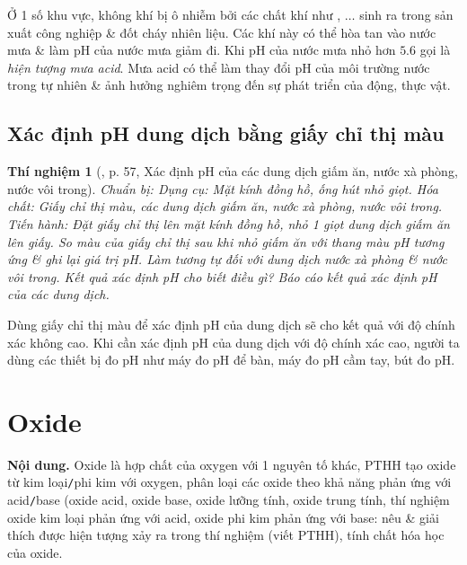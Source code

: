 \documentclass{article}
\newtheorem{thinghiem}{Thí nghiệm}
\begin{document}
Ở 1 số khu vực, không khí bị ô nhiễm bởi các chất khí như , $\ldots$ sinh ra trong sản xuất công nghiệp \& đốt cháy nhiên liệu. Các khí này có thể hòa tan vào nước mưa \& làm pH của nước mưa giảm đi. Khi pH của nước mưa nhỏ hơn $5.6$ gọi là \textit{hiện tượng mưa acid}. Mưa acid có thể làm thay đổi pH của môi trường nước trong tự nhiên \& ảnh hưởng nghiêm trọng đến sự phát triển của động, thực vật.

\subsection{Xác định pH dung dịch bằng giấy chỉ thị màu}

\begin{thinghiem}[\cite{SGK_KHTN_8_Canh_Dieu}, p. 57, Xác định pH của các dung dịch giấm ăn, nước xà phòng, nước vôi trong]
	{\rm Chuẩn bị:} Dụng cụ: Mặt kính đồng hồ, ống hút nhỏ giọt. Hóa chất: Giấy chỉ thị màu, các dung dịch giấm ăn, nước xà phòng, nước vôi trong. {\rm Tiến hành:} Đặt giấy chỉ thị lên mặt kính đồng hồ, nhỏ 1 giọt dung dịch giấm ăn lên giấy. So màu của giấy chỉ thị sau khi nhỏ giấm ăn với thang màu pH tương ứng \& ghi lại giá trị pH. Làm tương tự đối với dung dịch nước xà phòng \& nước vôi trong. Kết quả xác định pH cho biết điều gì? Báo cáo kết quả xác định pH của các dung dịch.
\end{thinghiem}
Dùng giấy chỉ thị màu để xác định pH của dung dịch sẽ cho kết quả với độ chính xác không cao. Khi cần xác định pH của dung dịch với độ chính xác cao, người ta dùng các thiết bị đo pH như máy đo pH để bàn, máy đo pH cầm tay, bút đo pH.

\noindent{}


\section{Oxide}
\textsf{\textbf{Nội dung.} Oxide là hợp chất của oxygen với 1 nguyên tố khác, PTHH tạo oxide từ kim loại{\tt/}phi kim với oxygen, phân loại các oxide theo khả năng phản ứng với acid{\tt/}base (oxide acid, oxide base, oxide lưỡng tính, oxide trung tính, thí nghiệm oxide kim loại phản ứng với acid, oxide phi kim phản ứng với base: nêu \& giải thích được hiện tượng xảy ra trong thí nghiệm (viết PTHH), tính chất hóa học của oxide.}
\end{document}
